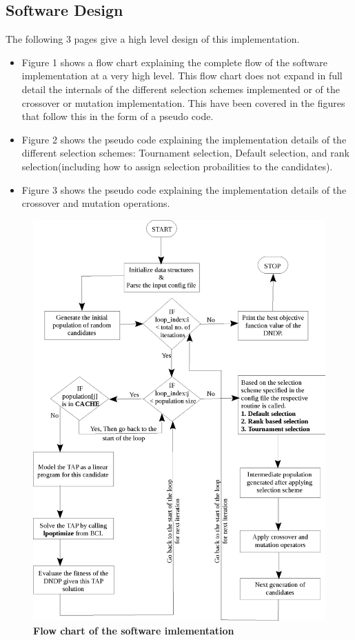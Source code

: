 \documentclass[a4paper, 12pt]{article}
\begin{document}
\subsection{Software Design}
The following 3 pages give a high level design of this implementation.
\begin{itemize}
\item Figure 1 shows a flow chart explaining the complete flow of the software implementation at a very high level. This flow chart does not expand in full detail the internals of the different selection schemes implemented or of the crossover or mutation implementation. This have been covered in the figures that follow this in the form of a pseudo code.
\item Figure 2 shows the pseudo code explaining the implementation details of the different selection schemes: Tournament selection, Default selection, and rank selection(including how to assign selection probailities to the candidates).
\item Figure 3 shows the pseudo code explaining the implementation details of the crossover and mutation operations.
\end{itemize}
\begin{figure}[htbp]
\hspace*{-0.3in}
\includegraphics[scale=0.95]{./diagram.eps}%
\caption{\textbf{Flow chart of the software imlementation}}
\label{fig 1}
\end{figure}
\end{document}
